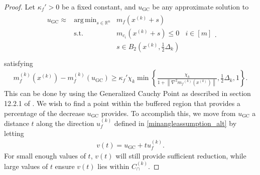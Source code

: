 \documentclass{article}
\theoremstyle{case}
\numberwithin{theorem}{subsection}
\DeclareMathOperator*{\argmin}{arg\,min}
\newcommand{\capcones}{{C^{(k)}_{\cap}}}
\newcommand{\dk}{\Delta_k}
\newcommand{\mfk}{{{m}_f}^{(k)}}
\newcommand{\Rn}{\mathbb R^n}
\newcommand{\xk}{x^{(k)}}
\newcommand{\minangledirk}{{u^{(k)}_f}}
\begin{document}
\begin{proof}

Let $\kappa_f' > 0$ be a fixed constant, and $u_{\textrm{GC}}$ be any approximate solution to 
\begin{align*}
\begin{array}{cccc}
u_{\textrm{GC}} \approx & \argmin_{s \in \Rn} & m_{f}(\xk + s) & \\
& \textrm{s.t.} & m_{c_i}(\xk + s) \le 0 & i \in [m]\\
& & s \in B_2\left(\xk, \frac 1 2 \dk\right) & \\
\end{array}.
\end{align*}
satisfying
\begin{align}
\label{what_ugc_satisfies}
m_f^{(k)}(\xk) - m_f^{(k)}(u_{\textrm{GC}}) \ge \kappa_f' \chi_k \min\left\{ \frac{\chi_k}{1+\left\|\nabla^2 \mfk(\xk)\right\|}, \frac 1 2 \dk, 1 \right\}.
\end{align}
This can be done by using the Generalized Cauchy Point as described in section 12.2.1 of \cite{Conn:2000:TM:357813}.
We wish to find a point within the buffered region that provides a percentage of the decrease $u_{\textrm{GC}}$ provides.
To accomplish this, we move from $u_{\textrm{GC}}$ a distance $t$ along the direction $\minangledirk$ defined in \cref{minangleassumption_alt} by letting 
\begin{align*}
v(t) = u_{\textrm{GC}} + t \minangledirk.
\end{align*}
For small enough values of $t$, $v(t)$ will still provide sufficient reduction,
while large values of $t$ ensure $v(t)$ lies within $\capcones$.


\end{proof}
\end{document}
